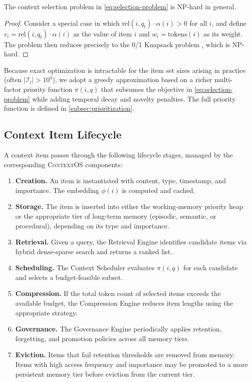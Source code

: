 \documentclass[review,12pt]{elsarticle}
\newcommand{\contextos}{\textsc{ContextOS}}
\newcommand{\prio}{\pi}
\newcommand{\rel}{\mathrm{rel}}
\newcommand{\tokens}{\mathrm{tokens}}
\begin{document}
\begin{proposition}[NP-Hardness]
\label{prop:np-hard}
The context selection problem in \cref{eq:selection-problem} is NP-hard in
general.
\end{proposition}
\begin{proof}
Consider a special case in which $\rel(i, q_t) \cdot \alpha(i) > 0$ for all
$i$, and define $v_i = \rel(i, q_t) \cdot \alpha(i)$ as the value of item $i$
and $w_i = \tokens(i)$ as its weight.  The problem then reduces precisely to
the 0/1 Knapsack problem \citep{garey1979computers}, which is NP-hard.
\end{proof}

Because exact optimization is intractable for the item set sizes arising in
practice (often $|\mathcal{I}_t| > 10^4$), we adopt a greedy approximation
based on a richer multi-factor priority function $\prio(i, q)$ that subsumes
the objective in \cref{eq:selection-problem} while adding temporal decay and
novelty penalties.  The full priority function is defined in
\cref{subsec:prioritization}.

\subsection{Context Item Lifecycle}
\label{subsec:lifecycle}

A context item passes through the following lifecycle stages, managed by the
corresponding \contextos{} components:
\begin{enumerate}[label=\textbf{Stage \arabic*.}, leftmargin=3.5em]
  \item \textbf{Creation.}  An item is instantiated with content, type,
  timestamp, and importance.  The embedding $\phi(i)$ is computed and cached.
  \item \textbf{Storage.}  The item is inserted into either the working-memory
  priority heap or the appropriate tier of long-term memory
  (episodic, semantic, or procedural), depending on its type and importance.
  \item \textbf{Retrieval.}  Given a query, the Retrieval Engine identifies
  candidate items via hybrid dense-sparse search and returns a ranked list.
  \item \textbf{Scheduling.}  The Context Scheduler evaluates $\prio(i, q)$
  for each candidate and selects a budget-feasible subset.
  \item \textbf{Compression.}  If the total token count of selected items
  exceeds the available budget, the Compression Engine reduces item lengths
  using the appropriate strategy.
  \item \textbf{Governance.}  The Governance Engine periodically applies
  retention, forgetting, and promotion policies across all memory tiers.
  \item \textbf{Eviction.}  Items that fail retention thresholds are removed
  from memory.  Items with high access frequency and importance may be
  promoted to a more persistent memory tier before eviction from the current tier.
\end{enumerate}
\end{document}
